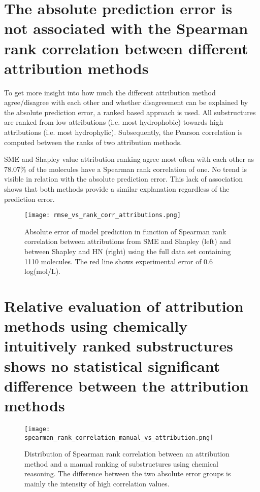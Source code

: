 \section{The absolute prediction error is not associated with the Spearman rank correlation between different attribution methods}


To get more insight into how much the different attribution method agree/disagree 
with each other and whether disagreement can be explained by the absolute prediction 
error, a ranked based approach is used. All substructures are ranked from low attributions 
(i.e. most hydrophobic) towards high attributions (i.e. most hydrophylic). Subsequently,
the Pearson correlation is computed between the ranks of two attribution methods. 


SME and Shapley value attribution ranking agree most often with each other as $78.07\%$
of the molecules have a Spearman rank correlation of one. No trend is visible 
in relation with the absolute prediction error. This lack of association shows 
that both methods provide a similar explanation regardless of the prediction error. 

 

\begin{figure}[h]
    \centering
    \texttt{[image: rmse\_vs\_rank\_corr\_attributions.png]}
    \caption{Absolute error of model prediction in function of Spearman rank correlation between 
        attributions from SME and Shapley (left) and between Shapley and HN (right) using the full 
        data set containing 1110 molecules. The red line shows experimental error of 0.6 log(mol/L).
    }
\end{figure}


\section{Relative evaluation of attribution methods using chemically intuitively ranked substructures shows no statistical
significant difference between the attribution methods}

\begin{figure}[h]
    \centering
    \texttt{[image: spearman\_rank\_correlation\_manual\_vs\_attribution.png]}
    \caption{Distribution of Spearman rank correlation between an attribution method 
        and a manual ranking of substructures using chemical reasoning. The difference 
        between the two absolute error groups is mainly the intensity of high 
        correlation values.
    }
    \label{fig:spearman_corr_manual}
\end{figure}


